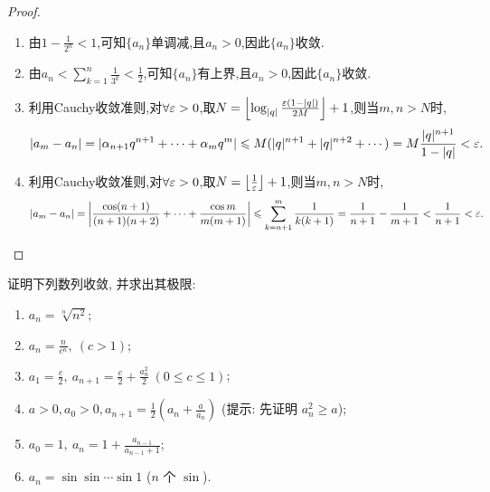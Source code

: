 \begin{proof}
    \begin{enumerate}[(1)]
        \item 由$1-\frac{1}{2^n} < 1$,可知$\{a_n\}$单调减,且$a_n > 0$,因此$\{a_n\}$收敛.
        \item 由$a_n < \sum_{k=1}^n \frac{1}{3^k} < \frac 12$,可知$\{a_n\}$有上界,且$a_n > 0$,因此$\{a_n\}$收敛.
        \item 利用Cauchy收敛准则,对$\forall \varepsilon >0$,取$N = \left\lfloor \log_{|q|} \frac{\varepsilon(1-|q|)}{2M} \right\rfloor + 1$,则当$m,n>N$时,$$|a_m-a_n| = |\alpha_{n+1}q^{n+1}+\cdots+\alpha_m q^m| \leqslant M(|q|^{n+1}+|q|^{n+2}+\cdots) = M\frac{|q|^{n+1}}{1-|q|} < \varepsilon.$$
        \item 利用Cauchy收敛准则,对$\forall \varepsilon >0$,取$N = \left\lfloor \frac{1}{\varepsilon} \right\rfloor + 1$,则当$m,n>N$时,$$|a_m-a_n| = \left|\frac{\cos(n+1)}{(n+1)(n+2)}+\cdots+\frac{\cos m}{m(m+1)}\right| \leqslant \sum_{k=n+1}^m \frac{1}{k(k+1)} = \frac{1}{n+1} - \frac{1}{m+1} < \frac{1}{n+1} < \varepsilon.$$
    \end{enumerate}
\end{proof}

\begin{exercise}[1.2.18]
    证明下列数列收敛, 并求出其极限:
    \begin{enumerate}[(1)]
        \item $a_n = \sqrt[n]{n^2}$;
        \item $a_n = \frac{n}{c^n}, \ (c>1)$;
        \item $a_1 = \frac{c}{2}, \ a_{n+1} = \frac{c}{2} + \frac{a_n^2}{2} \ (0 \le c \le 1)$;
        \item $a > 0, a_0 > 0, a_{n+1} = \frac{1}{2} \left(a_n + \frac{a}{a_n}\right)$ (提示: 先证明 $a_n^2 \ge a$);
        \item $a_0 = 1, \ a_n = 1 + \frac{a_{n-1}}{a_{n-1} + 1}$;
        \item $a_n = \sin \sin \cdots \sin 1$ ($n$ 个 $\sin$).
    \end{enumerate}
\end{exercise}

